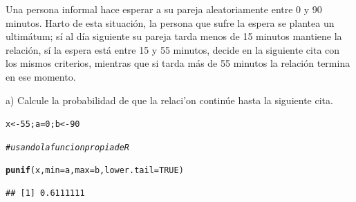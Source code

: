 \documentclass[12pt,letterpaper]{article}\usepackage[]{graphicx}\usepackage[]{color}
\makeatletter
\newcommand{\hlnum}[1]{\textcolor[rgb]{0.686,0.059,0.569}{#1}}%
\newcommand{\hlcom}[1]{\textcolor[rgb]{0.678,0.584,0.686}{\textit{#1}}}%
\newcommand{\hlstd}[1]{\textcolor[rgb]{0.345,0.345,0.345}{#1}}%
\newcommand{\hlkwb}[1]{\textcolor[rgb]{0.69,0.353,0.396}{#1}}%
\newcommand{\hlkwc}[1]{\textcolor[rgb]{0.333,0.667,0.333}{#1}}%
\newcommand{\hlkwd}[1]{\textcolor[rgb]{0.737,0.353,0.396}{\textbf{#1}}}%
\newenvironment{kframe}{%
 \def\at@end@of@kframe{}%
 \ifinner\ifhmode%
  \def\at@end@of@kframe{\end{minipage}}%
  \begin{minipage}{\columnwidth}%
 \fi\fi%
 \def\FrameCommand##1{\hskip\@totalleftmargin \hskip-\fboxsep
 \colorbox{shadecolor}{##1}\hskip-\fboxsep
     \hskip-\linewidth \hskip-\@totalleftmargin \hskip\columnwidth}%
 \MakeFramed {\advance\hsize-\width
   \@totalleftmargin\z@ \linewidth\hsize
   \@setminipage}}%
 {\par\unskip\endMakeFramed%
 \at@end@of@kframe}
\newenvironment{knitrout}{}{} %
\makeatother
\begin{document}
Una persona informal hace esperar a su pareja aleatoriamente entre 0 y 90 minutos. Harto de esta situaci\'on, la persona que sufre la espera se plantea un ultim\'atum; s\'i al d\'ia siguiente su pareja tarda menos de 15 minutos mantiene la relaci\'on, s\'i la espera est\'a entre 15 y 55 minutos, decide en la siguiente cita con los mismos criterios, mientras que si tarda m\'as de 55 minutos la relaci\'on termina en ese momento.

\begin{description}
  \item a) Calcule la probabilidad de que la relaci'on contin\'ue hasta la siguiente cita. 
\begin{knitrout}
\color{fgcolor}\begin{kframe}
\begin{alltt}
\hlstd{x} \hlkwb{<-} \hlnum{55}\hlstd{; a}\hlkwb{=}\hlnum{0}\hlstd{; b} \hlkwb{<-} \hlnum{90}

\hlcom{# usando la funcion propia de R }

\hlkwd{punif}\hlstd{(x,} \hlkwc{min}\hlstd{=a,} \hlkwc{max}\hlstd{=b,} \hlkwc{lower.tail}\hlstd{=}\hlnum{TRUE}\hlstd{)}
\end{alltt}
\begin{verbatim}
## [1] 0.6111111
\end{verbatim}
\end{kframe}
\end{knitrout}
\end{description}
\end{document}
